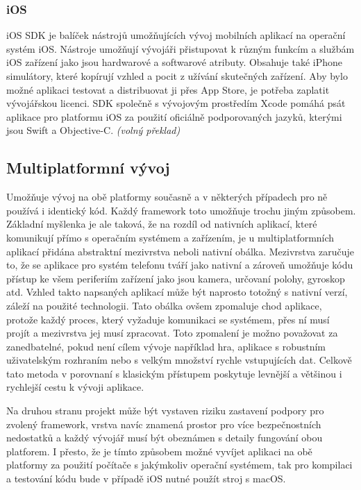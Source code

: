 \documentclass[
  glossaries,
]{kidiplom}
\begin{document}
\subsubsection{iOS}
iOS SDK je balíček nástrojů umožňujících vývoj mobilních aplikací na operační systém iOS. Nástroje umožňují vývojáři přistupovat k různým funkcím a službám iOS zařízení jako jsou hardwarové a softwarové atributy. Obsahuje také iPhone simulátory, které kopírují vzhled a pocit z užívání skutečných zařízení. Aby bylo možné aplikaci testovat a distribuovat ji přes App Store, je potřeba zaplatit vývojářskou licenci. SDK společně s vývojovým prostředím Xcode pomáhá psát aplikace pro platformu iOS za použití oficiálně podporovaných jazyků, kterými jsou Swift a Objective-C. 
\cite{2}
\textit{(volný překlad)}

\subsection{Multiplatformní vývoj}
Umožňuje vývoj na obě platformy současně a v některých případech pro ně používá i identický kód. Každý framework toto umožňuje trochu jiným způsobem. Základní myšlenka je ale taková, že na rozdíl od nativních aplikací, které komunikují přímo s operačním systémem a zařízením, je u multiplatformních aplikací přidána abstraktní mezivrstva neboli nativní obálka. Mezivrstva zaručuje to, že se aplikace pro systém telefonu tváří jako nativní a zároveň umožňuje kódu přístup ke všem periferiím zařízení jako jsou kamera, určovaní polohy, gyroskop atd. Vzhled takto napsaných aplikací může být naprosto totožný s nativní verzí, záleží na použité technologii. Tato obálka ovšem zpomaluje chod aplikace, protože každý proces, který vyžaduje komunikaci se systémem, přes ní musí projít a mezivrstva jej musí zpracovat. Toto zpomalení je možno považovat za zanedbatelné, pokud není cílem vývoje například hra, aplikace s robustním uživatelským rozhraním nebo s velkým množství rychle vstupujících dat. Celkově tato metoda v porovnaní s klasickým přístupem poskytuje levnější a většinou i rychlejší cestu k vývoji aplikace. 

Na druhou stranu projekt může být vystaven riziku zastavení podpory pro zvolený framework, vrstva navíc znamená prostor pro více bezpečnostních nedostatků a každý vývojář musí být obeznámen s detaily fungování obou platforem. I přesto, že je tímto způsobem možné vyvíjet aplikaci na obě platformy za použití počítače s jakýmkoliv operační systémem, tak pro kompilaci a testování kódu bude v případě iOS nutné použít stroj s macOS. 
\end{document}
